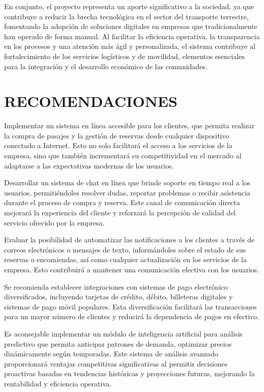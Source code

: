 	En conjunto, el proyecto representa un aporte significativo a la sociedad, ya que contribuye a reducir la brecha tecnológica en el sector del transporte terrestre, fomentando la adopción de soluciones digitales en empresas que tradicionalmente han operado de forma manual. Al facilitar la eficiencia operativa, la transparencia en los procesos y una atención más ágil y personalizada, el sistema contribuye al fortalecimiento de los servicios logísticos y de movilidad, elementos esenciales para la integración y el desarrollo económico de las comunidades.

\section{RECOMENDACIONES}

	Implementar un sistema en línea accesible para los clientes, que permita realizar la compra de pasajes y la gestión de reservas desde cualquier dispositivo conectado a Internet. Esto no solo facilitará el acceso a los servicios de la empresa, sino que también incrementará su competitividad en el mercado al adaptarse a las expectativas modernas de los usuarios.
	
	
	Desarrollar un sistema de chat en línea que brinde soporte en tiempo real a los usuarios, permitiéndoles resolver dudas, reportar problemas o recibir asistencia durante el proceso de compra y reserva. Este canal de comunicación directa mejorará la experiencia del cliente y reforzará la percepción de calidad del servicio ofrecido por la empresa.
	
	Evaluar la posibilidad de automatizar las notificaciones a los clientes a través de correos electrónicos o mensajes de texto, informándoles sobre el estado de sus reservas o encomiendas, así como cualquier actualización en los servicios de la empresa. Esto contribuirá a mantener una comunicación efectiva con los usuarios.
	
	Se recomienda establecer integraciones con sistemas de pago electrónico diversificados, incluyendo tarjetas de crédito, débito, billeteras digitales y sistemas de pago móvil populares. Esta diversificación facilitará las transacciones para un mayor número de clientes y reducirá la dependencia de pagos en efectivo.
	
	Es aconsejable implementar un módulo de inteligencia artificial para análisis predictivo que permita anticipar patrones de demanda, optimizar precios dinámicamente según temporadas. Este sistema de análisis avanzado proporcionará ventajas competitivas significativas al permitir decisiones proactivas basadas en tendencias históricas y proyecciones futuras, mejorando la rentabilidad y eficiencia operativa.